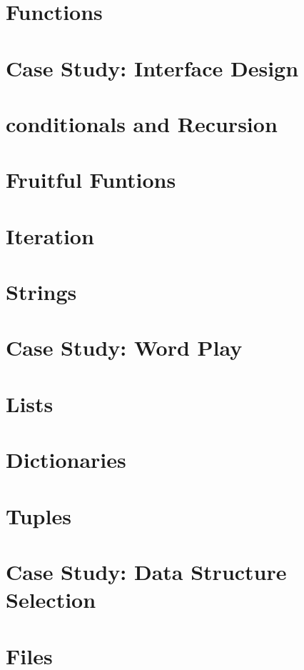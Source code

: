 \documentclass[a4paper,11pt]{book}
\begin{document}
\chapter{Functions}



\chapter{Case Study: Interface Design}
\chapter{conditionals and Recursion}
\chapter{Fruitful Funtions}
\chapter{Iteration}
\chapter{Strings}
\chapter{Case Study: Word Play}
\chapter{Lists}
\chapter{Dictionaries}
\chapter{Tuples}
\chapter{Case Study: Data Structure Selection}
\chapter{Files}
\end{document}
